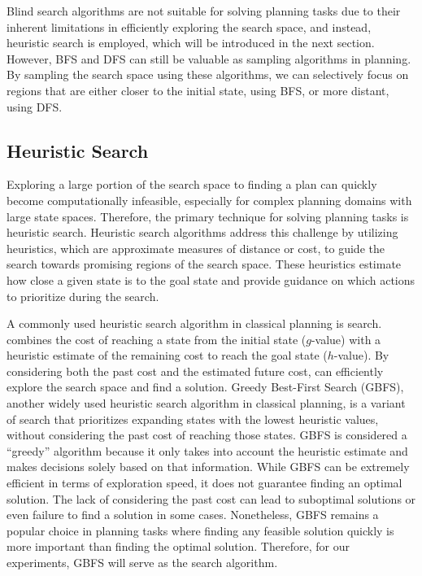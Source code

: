 Blind search algorithms are not suitable for solving planning tasks due to their inherent limitations in efficiently exploring the search space, and instead, heuristic search is employed, which will be introduced in the next section. However, BFS and DFS can still be valuable as sampling algorithms in planning. By sampling the search space using these algorithms, we can selectively focus on regions that are either closer to the initial state, using BFS, or more distant, using DFS.

\subsection{Heuristic Search}
\label{sec:background_heuristicsearch}

Exploring a large portion of the search space to finding a plan can quickly become computationally infeasible, especially for complex planning domains with large state spaces. Therefore, the primary technique for solving planning tasks is heuristic search. Heuristic search algorithms address this challenge by utilizing heuristics, which are approximate measures of distance or cost, to guide the search towards promising regions of the search space. These heuristics estimate how close a given state is to the goal state and provide guidance on which actions to prioritize during the search.

A commonly used heuristic search algorithm in classical planning is \astar search. \astar combines the cost of reaching a state from the initial state ($g$-value) with a heuristic estimate of the remaining cost to reach the goal state ($h$-value). By considering both the past cost and the estimated future cost, \astar can efficiently explore the search space and find a solution. Greedy Best-First Search (GBFS), another widely used heuristic search algorithm in classical planning, is a variant of \astar search that prioritizes expanding states with the lowest heuristic values, without considering the past cost of reaching those states. GBFS is considered a ``greedy'' algorithm because it only takes into account the heuristic estimate and makes decisions solely based on that information. While GBFS can be extremely efficient in terms of exploration speed, it does not guarantee finding an optimal solution. The lack of considering the past cost can lead to suboptimal solutions or even failure to find a solution in some cases. Nonetheless, GBFS remains a popular choice in planning tasks where finding any feasible solution quickly is more important than finding the optimal solution. Therefore, for our experiments, GBFS will serve as the search algorithm.

